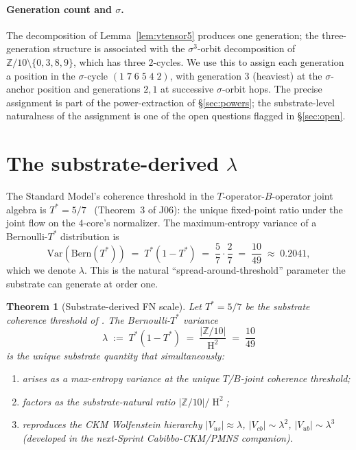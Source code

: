 \documentclass[11pt,reqno]{amsart}
\theoremstyle{plain}
\newtheorem{theorem}{Theorem}[section]
\theoremstyle{definition}
\theoremstyle{remark}
\newcommand{\Z}{\mathbb{Z}}
\DeclareMathOperator{\HARM}{H}    %
\begin{document}
\paragraph{Generation count and $\sigma$.}
The decomposition of Lemma~\ref{lem:vtensor5} produces one
generation; the three-generation structure is associated with
the $\sigma^{3}$-orbit decomposition of $\Z/10
\setminus\{0,3,8,9\}$, which has three $2$-cycles. We use this
to assign each generation a position in the $\sigma$-cycle
$(1\;7\;6\;5\;4\;2)$, with generation $3$ (heaviest) at the
$\sigma$-anchor position and generations $2, 1$ at successive
$\sigma$-orbit hops. The precise assignment is part of the
power-extraction of \S\ref{sec:powers}; the substrate-level
naturalness of the assignment is one of the open questions
flagged in \S\ref{sec:open}.

\section{The substrate-derived $\lambda$}\label{sec:lambda}

The Standard Model's coherence threshold in the
$T$-operator-$B$-operator joint algebra is
$T^{*} = 5/7$~\cite{SandersGish2026FourCore} (Theorem~3 of
J06): the unique fixed-point ratio under the joint flow on the
$4$-core's normalizer. The maximum-entropy variance of a
Bernoulli-$T^{*}$ distribution is
\[
  \mathrm{Var}(\mathrm{Bern}(T^{*}))
  \;=\; T^{*}(1 - T^{*})
  \;=\; \frac{5}{7} \cdot \frac{2}{7}
  \;=\; \frac{10}{49}
  \;\approx\; 0.2041,
\]
which we denote $\lambda$. This is the natural
``spread-around-threshold'' parameter the substrate can
generate at order one.

\begin{theorem}[Substrate-derived FN scale]\label{thm:lambda}
Let $T^{*} = 5/7$ be the substrate coherence threshold of
\cite{SandersGish2026FourCore}. The Bernoulli-$T^{*}$ variance
\[
  \lambda \;:=\; T^{*}(1 - T^{*}) \;=\; \frac{|\Z/10|}{\HARM^{2}} \;=\; \frac{10}{49}
\]
is the unique substrate quantity that simultaneously:
\begin{enumerate}
\item arises as a max-entropy variance at the unique
$T$/$B$-joint coherence threshold;
\item factors as the substrate-natural ratio
$|\Z/10|/\HARM^{2}$;
\item reproduces the CKM Wolfenstein hierarchy
$|V_{us}| \approx \lambda$, $|V_{cb}| \sim \lambda^{2}$,
$|V_{ub}| \sim \lambda^{3}$ (developed in the next-Sprint
Cabibbo-CKM/PMNS companion).
\end{enumerate}
\end{theorem}
\end{document}
